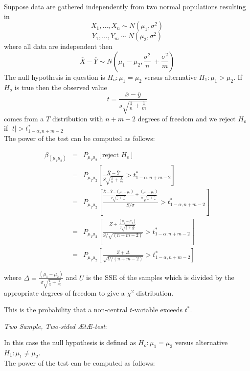 \documentclass[12pt,a4paper]{article}
\theoremstyle{regla}
\theoremstyle{remark}
\theoremstyle{definition}
\theoremstyle{nonumberbreak}
\begin{document}
Suppose data are gathered independently from two normal populations resulting in
 $$X_1, \ldots, X_n \sim N(\mu_1, \sigma^2)$$
 $$Y_1, \ldots, Y_m \sim N(\mu_2, \sigma^2)$$
where all data are independent then $$ \overline{X}-\overline{Y} \sim N(\mu_1 - \mu_2, \frac{\sigma^2}{n}\ + \frac{\sigma^2}{m})$$
The null hypothesis in question is $H_o: \mu_1 = \mu_2$ versus alternative $H_1: \mu_1 > \mu_2$.
If $H_o$ is true then the observed value
$$ t = \frac{\overline{x}-\overline{y}}{s\sqrt{\frac{1}{n}+\frac{1}{m}}} $$
comes from a $T$ distribution with $n+m-2$ degrees of freedom and we reject $H_o$ if $\left|t \right|> t^\ast_{1-\alpha,n+m-2}$\\

The power of the test can be computed as follows:

\begin{eqnarray*}
\beta_{(\mu_1\mu_2)}& = & P_{\mu_1\mu_2}\left[\text{reject } H_o \right]\\
& = & P_{\mu_1\mu_2}\left[\frac{\overline{X}-\overline{Y}}{S\sqrt{\frac{1}{n}+\frac{1}{m}}} > t^\ast_{1-\alpha,n+m-2} \right]\\
& = &  P_{\mu_1\mu_2}\left[\frac{\frac{\overline{X}-\overline{Y}-(\mu_1-\mu_2)}{\sigma\sqrt{\frac{1}{n}+\frac{1}{m}}}+ \frac{(\mu_1-\mu_2)}{\sigma\sqrt{\frac{1}{n}+\frac{1}{m}}}}{S/\sigma} > t^\ast_{1-\alpha,n+m-2}\right]\\
& = &  P_{\mu_1\mu_2}\left[\frac{Z +\frac{(\mu_1-\mu_2)}{\sigma\sqrt{\frac{1}{n}+\frac{1}{m}}}}
{S/\sqrt{(n+m-2)}} > t^\ast_{1-\alpha,n+m-2} \right]\\
& = &  P_{\mu_1\mu_2}\left[ \frac{Z + \Delta}{\sqrt{U/(n+m-2)}} > t^\ast_{1-\alpha,n+m-2} \right]
\end{eqnarray*}

where $\Delta = \frac{(\mu_1-\mu_2)}{\sigma\sqrt{\frac{1}{n}+\frac{1}{m}}} $ and 
$U$ is the SSE of the samples which is divided by the appropriate degrees of freedom to give a $\chi^2$ distribution.

This is the probability that a non-central $t$-variable exceeds $t^\ast$.

\emph{Two Sample, Two-sided ÆtÆ-test}:

In this case the null hypothesis is defined as $H_o: \mu_1 = \mu_2$ versus alternative $H_1: \mu_1 \neq \mu_2$. \\

The power of the test can be computed as follows:\\
\end{document}
